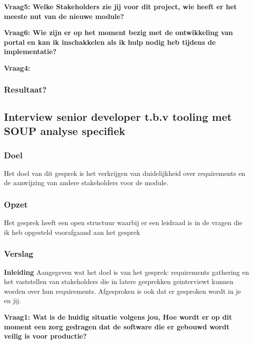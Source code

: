 \lipsum[05]
\bigskip

\textbf{Vraag5: Welke Stakeholders zie jij voor dit project, wie heeft er het meeste nut van de nieuwe module? }

\lipsum[06]
\bigskip

\textbf{Vraag6: Wie zijn er op het moment bezig met de ontwikkeling van portal en kan ik inschakkelen als ik hulp nodig heb tijdens de implementatie?}

\lipsum[09]
\bigskip

\textbf{Vraag4: }

\lipsum[07]

\subsubsection{Resultaat?}

\subsection{Interview senior developer t.b.v tooling met SOUP analyse specifiek}

\subsubsection{Doel}
Het doel van dit gesprek is het verkrijgen van duidelijkheid over requirements en de aanwijzing van andere stakeholders voor de module.

\subsubsection{Opzet}
Het gesprek heeft een open structuur waarbij er een leidraad is in de vragen die ik heb opgesteld voorafgaand aan het gesprek

\subsubsection{Verslag}
\textbf{Inleiding}
Aangegeven wat het doel is van het gesprek: requirements gathering en het vaststellen van stakeholders die in latere gesprekken geinterviewt kunnen worden over hun requirements. Afgesproken is ook dat er gesproken wordt in je en jij.

\bigskip

\textbf{Vraag1: Wat is de huidig situatie volgens jou, Hoe wordt er op dit moment een zorg gedragen dat de software die er gebouwd wordt veilig is voor productie?}

\lipsum[01]
\bigskip

